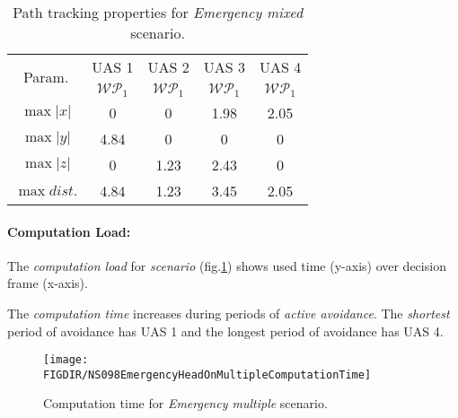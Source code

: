     \begin{table}[H]
        \centering
        \begin{tabular}{c||c|c|c|c}
            \multirow{2}{*}{Param.} & UAS 1     & UAS 2             & UAS 3             & UAS 4 \\\cline{2-5}
                            & $\mathscr{WP}_1$  & $\mathscr{WP}_1$  & $\mathscr{WP}_1$  & $\mathscr{WP}_1$ \\\hline\hline
              $\max |x|$    & 0                 & 0                 & 1.98              & 2.05\\\hline
              $\max |y|$    & 4.84              & 0                 & 0                 & 0\\\hline
              $\max |z|$    & 0                 & 1.23              & 2.43              & 0\\\hline
              $\max dist.$  & 4.84              & 1.23              & 3.45              & 2.05\\
        \end{tabular}
        \caption{Path tracking properties for \emph{Emergency mixed} scenario.}
        \label{tab:pathTrackingParametersForEmergencyMixed}
    \end{table}    


\newpage
\paragraph{Computation Load:} The \emph{computation load} for \emph{scenario} (fig.\ref{fig:emergencyHeadOnMultipleComputationTime}) shows used time (y-axis) over decision frame (x-axis).

The \emph{computation time} increases during periods of \emph{active avoidance}. The \emph{shortest} period of avoidance has UAS 1 and the longest period of avoidance has UAS 4.

\begin{figure}[H]
    \centering
    \texttt{[image: \\FIGDIR/NS098EmergencyHeadOnMultipleComputationTime]} 
    \caption{Computation time for \emph{Emergency multiple} scenario.}
    \label{fig:emergencyHeadOnMultipleComputationTime}
\end{figure}

